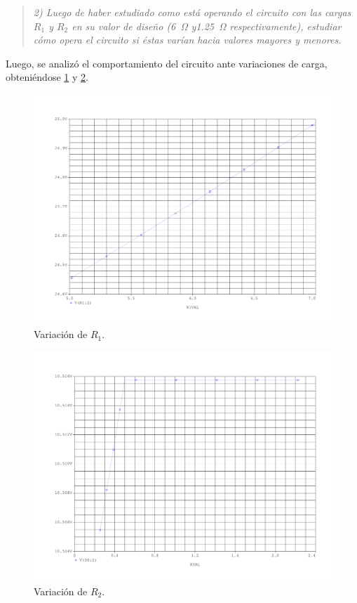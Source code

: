 \begin{quote} \textit{2) Luego de haber estudiado como está operando el circuito con las cargas $R_1$ y $R_2$ en su valor de diseño (\SI{6}{\ohm} y\SI{1.25}{\ohm} respectivamente), estudiar cómo opera el circuito si éstas varían hacia valores mayores y menores.}
\end{quote}
Luego, se analizó el comportamiento del circuito ante variaciones de carga, obteniéndose \ref{fig:var_R1} y \ref{fig:var_R2}.

\begin{figure}[H]
	\centering
	\includegraphics[scale=0.5]{Figuras/2_var_R1.pdf}
	\caption{Variación de $R_1$.}
	\label{fig:var_R1}
\end{figure}




\begin{figure}[H]
	\centering
	\includegraphics[scale=0.5]{Figuras/2_var_R2.pdf}
	\caption{Variación de $R_2$.}
	\label{fig:var_R2}
\end{figure}



